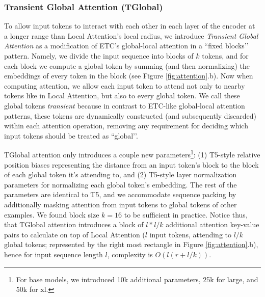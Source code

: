 \documentclass[11pt]{article}
\begin{document}
\subsubsection{Transient Global Attention (TGlobal)}
To allow input tokens to interact with each other in each layer of the encoder at a longer range than Local Attention’s local radius, we introduce {\em Transient Global Attention} as a modification of ETC’s global-local attention in a ``fixed blocks’’ pattern.  Namely, we divide the input sequence into blocks of $k$ tokens, and for each block we compute a global token by summing (and then normalizing) the embeddings of every token in the block (see Figure \ref{fig:attention}.b).  Now when computing attention, we allow each input token to attend not only to nearby tokens like in Local Attention, but also to every global token. We call these global tokens \emph{transient} because in contrast to ETC-like global-local attention patterns, these tokens are dynamically constructed (and subsequently discarded) within each attention operation, removing any requirement for deciding which input tokens should be treated as ``global’’.

TGlobal attention only introduces a couple new parameters\footnote{For base models, we introduced 10k additional parameters, 25k for large, and 50k for xl.}: (1) T5-style relative position biases representing the distance from an input token’s block to the block of each global token it’s attending to, and (2) T5-style layer normalization parameters for normalizing each global token’s embedding.  The rest of the parameters are identical to T5, and we accommodate sequence packing by additionally masking attention from input tokens to global tokens of other examples.  We found block size $k = 16$ to be sufficient in practice. Notice thus, that TGlobal attention introduces a block of $l * l/k$ additional attention key-value pairs to calculate on top of Local Attention ($l$ input tokens, attending to $l/k$ global tokens; represented by the right most rectangle in Figure \ref{fig:attention}.b), hence
for input sequence length $l$, complexity is $O(l(r + l/k))$.
\end{document}
